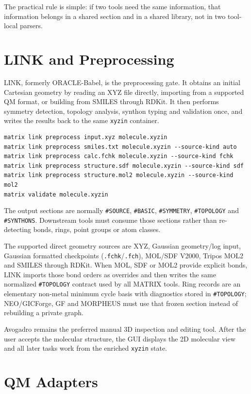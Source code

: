 \documentclass[11pt]{article}
\newcommand{\xyzin}{\texttt{xyzin}}
\newcommand{\sectionname}[1]{\texttt{\##1}}
\begin{document}
The practical rule is simple: if two tools need the same information, that
information belongs in a shared section and in a shared library, not in two
tool-local parsers.

\section{LINK and Preprocessing}

LINK, formerly ORACLE-Babel, is the preprocessing gate.  It obtains an initial Cartesian
geometry by reading an XYZ file directly, importing from a supported QM format,
or building from SMILES through RDKit.  It then performs symmetry detection,
topology analysis, synthon typing and validation once, and writes the results
back to the same \xyzin{} container.

\begin{lstlisting}[style=matrix]
matrix link preprocess input.xyz molecule.xyzin
matrix link preprocess smiles.txt molecule.xyzin --source-kind auto
matrix link preprocess calc.fchk molecule.xyzin --source-kind fchk
matrix link preprocess structure.sdf molecule.xyzin --source-kind sdf
matrix link preprocess structure.mol2 molecule.xyzin --source-kind mol2
matrix validate molecule.xyzin
\end{lstlisting}

The output sections are normally \sectionname{SOURCE}, \sectionname{BASIC},
\sectionname{SYMMETRY}, \sectionname{TOPOLOGY} and \sectionname{SYNTHONS}.
Downstream tools must consume those sections rather than re-detecting bonds,
rings, point groups or atom classes.

The supported direct geometry sources are XYZ, Gaussian geometry/log input,
Gaussian formatted checkpoints (\texttt{.fchk}/\texttt{.fch}), MOL/SDF V2000,
Tripos MOL2 and SMILES through RDKit.  When MOL, SDF or MOL2 provide explicit
bonds, LINK imports those bond orders as overrides and then writes the same
normalized \sectionname{TOPOLOGY} contract used by all MATRIX tools.  Ring
records are an elementary non-metal minimum cycle basis with diagnostics stored
in \sectionname{TOPOLOGY}; NEO/GICForge, GF and MORPHEUS must use that frozen
section instead of rebuilding a private graph.

Avogadro remains the preferred manual 3D inspection and editing tool.  After
the user accepts the molecular structure, the GUI displays the 2D molecular
view and all later tasks work from the enriched \xyzin{} state.

\section{QM Adapters}
\end{document}
